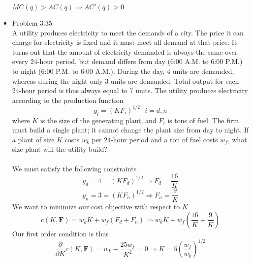 \documentclass{article}
\begin{document}
\begin{itemize}
    $MC(q)>AC(q)\Rightarrow AC'(q)>0$
    \pagebreak
    \item Problem 3.35\\
    A utility produces electricity to meet the demands of a city.  The price it can charge for electricity is fixed and it must meet all demand at that price.  It turns out that the amount of electricity demanded is always the same over every 24-hour period, but demand differs from day (6:00 A.M. to 6:00 P.M.) to night (6:00 P.M. to 6:00 A.M.).  During the day, 4 units are demanded, whereas during the night only 3 units are demanded.  Total output for each 24-hour period is thus always equal to 7 units.  The utility produces electricity according to the production function\\
    $$y_i=(KF_i)^{1/2}\text{ }i=d,n$$
    where $K$ is the size of the generating plant, and $F_i$ is tons of fuel.  The firm must build a single plant; it cannot change the plant size from day to night.  If a plant of size $K$ costs $w_k$ per 24-hour period and a ton of fuel costs $w_f$, what size plant will the utility build?\\\\
    We must satisfy the following constraints\\
    $$y_d=4=(KF_d)^{1/2}\Rightarrow F_d=\dfrac{16}{K}$$
    $$y_n=3=(KF_n)^{1/2}\Rightarrow F_n=\dfrac{9}{K}$$
    We want to minimize our cost objective with respect to $K$\\
    $$c(K,\textbf{F})=w_kK+w_f(F_d+F_n)\Rightarrow w_kK+w_f(\dfrac{16}{K}+\dfrac{9}{K})$$
    Our first order condition is thus\\
    $$\dfrac{\partial}{\partial K}c(K,\textbf{F})=w_k-\dfrac{25w_f}{K^2}=0\Rightarrow K=5(\dfrac{w_f}{w_k})^{1/2}$$
\end{itemize}
\pagebreak
\end{document}
